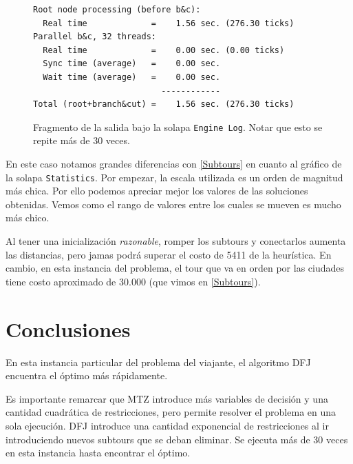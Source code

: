 \documentclass[titlepage,a4paper,oneside]{article}
\begin{document}
\begin{figure}[H]
\begin{verbatim}
Root node processing (before b&c):
  Real time             =    1.56 sec. (276.30 ticks)
Parallel b&c, 32 threads:
  Real time             =    0.00 sec. (0.00 ticks)
  Sync time (average)   =    0.00 sec.
  Wait time (average)   =    0.00 sec.
                          ------------
Total (root+branch&cut) =    1.56 sec. (276.30 ticks)
\end{verbatim}
\caption{Fragmento de la salida bajo la solapa \texttt{Engine Log}. Notar que esto se repite más de 30 veces.}
\end{figure}

En este caso notamos grandes diferencias con \ref{Subtours} en cuanto al gráfico de la solapa \texttt{Statistics}. Por empezar, la escala utilizada es un orden de magnitud más chica. Por ello podemos apreciar mejor los valores de las soluciones obtenidas. Vemos como el rango de valores entre los cuales se mueven es mucho más chico.

Al tener una inicialización \textit{razonable}, romper los subtours y conectarlos aumenta las distancias, pero jamas podrá superar el costo de 5411 de la heurística. En cambio, en esta instancia del problema, el tour que va en orden por las ciudades tiene costo aproximado de 30.000 (que vimos en \ref{Subtours}).

\section{Conclusiones}
En esta instancia particular del problema del viajante, el algoritmo DFJ encuentra el óptimo más rápidamente.

Es importante remarcar que MTZ introduce más variables de decisión y una cantidad cuadrática de restricciones, pero permite resolver el problema en una sola ejecución. DFJ introduce una cantidad exponencial de restricciones al ir introduciendo nuevos subtours que se deban eliminar. Se ejecuta más de 30 veces en esta instancia hasta encontrar el óptimo.

\printbibliography
\end{document}
